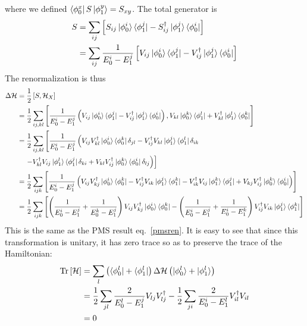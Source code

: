 where we defined \(\bra{\phi_0^x}S\ket{\phi_1^y} = S_{xy}\). The total generator is
\begin{equation}\begin{aligned}
	\label{swtgen}
	S &= \sum_{ij}\left[S_{ij}\ket{\phi_0^i}\bra{\phi_1^j} - S_{ij}^\dagger\ket{\phi_1^j}\bra{\phi_0^i}\right]\\
	  &= \sum_{ij}\frac{1}{E_0^i - E_1^j}\left[V_{ij}\ket{\phi_0^i}\bra{\phi_1^j} - V^\dagger_{ij}\ket{\phi_1^j}\bra{\phi_0^i}\right]\\
\end{aligned}\end{equation}
The renormalization is thus
\begin{equation}\begin{aligned}
	\Delta \mathcal{H} &= \frac{1}{2} \left[S,\mathcal{H}_X\right]\\
			   &= \frac{1}{2} \sum_{ij,kl}\left[\frac{1}{E_0^i - E_1^j}\left(V_{ij}\ket{\phi_0^i}\bra{\phi_1^j} - V^\dagger_{ij}\ket{\phi_1^j}\bra{\phi_0^i}\right), V_{kl} \ket{\phi_0^k}\bra{\phi_1^l}+ V^\dagger_{kl} \ket{\phi_1^l}\bra{\phi_0^k}\right]\\
                  &= \frac{1}{2} \sum_{ij,kl}\left[\frac{1}{E_0^i - E_1^j}\left(V_{ij}V^\dagger_{kl}\ket{\phi_0^i}\bra{\phi_0^k}\delta_{jl} - V^\dagger_{ij}V_{kl}\ket{\phi_1^j}\bra{\phi_1^l}\delta_{ik}\right.\right.\\
                  &\quad\left.\left.- V^\dagger_{kl}V_{ij}\ket{\phi_1^l}\bra{\phi_1^j}\delta_{ki} + V_{kl}V^\dagger_{ij}\ket{\phi_0^k}\bra{\phi_0^i}\delta_{lj}\right)\right]\\
                  &= \frac{1}{2} \sum_{ijk}\left[\frac{1}{E_0^i - E_1^j}\left(V_{ij}V^\dagger_{kj}\ket{\phi_0^i}\bra{\phi_0^k} - V^\dagger_{ij}V_{ik}\ket{\phi_1^j}\bra{\phi_1^k}- V^\dagger_{ik}V_{ij}\ket{\phi_1^k}\bra{\phi_1^j} + V_{kj}V^\dagger_{ij}\ket{\phi_0^k}\bra{\phi_0^i}\right)\right]\\
		  &= \frac{1}{2} \sum_{ijk}\left[\left(\frac{1}{E_0^i - E_1^j} + \frac{1}{E_0^k - E_1^j}\right)V_{ij}V^\dagger_{kj}\ket{\phi_0^i}\bra{\phi_0^k} - \left(\frac{1}{E_0^i - E_1^j} + \frac{1}{E_0^i - E_1^k}\right)V^\dagger_{ij}V_{ik}\ket{\phi_1^j}\bra{\phi_1^k}\right]\\
\end{aligned}\end{equation}
This is the same as the PMS result eq.~\ref{pmsren}. It is easy to see that since this transformation is unitary, it has zero trace so as to preserve the trace of the Hamiltonian:
\begin{equation}\begin{aligned}
	\text{Tr}\left[\mathcal{H}\right] &= \sum_{l}\left(\bra{\phi_0^l} + \bra{\phi_1^l}\right)\Delta \mathcal{H}\left(\ket{\phi_0^l} + \ket{\phi_1^l}\right)\\
		&= \frac{1}{2} \sum_{jl}\frac{2}{E_0^l - E_1^j}V_{lj}V^\dagger_{lj} - \frac{1}{2} \sum_{ji}\frac{2}{E_0^i - E_1^l}V^\dagger_{il}V_{il}\\
		&= 0
\end{aligned}\end{equation}

